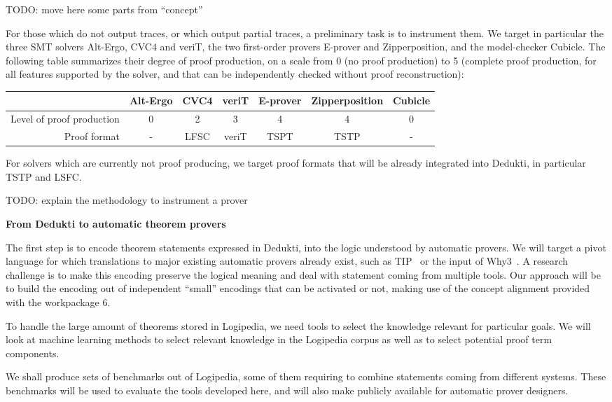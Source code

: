 TODO: move here some parts from ``concept''

For those which do not output traces, or which output partial traces, a
preliminary task is to instrument them. We target in particular the
three SMT solvers Alt-Ergo, CVC4 and veriT, the two first-order provers
E-prover and Zipperposition, and the model-checker Cubicle. The
following table summarizes their degree of proof production, on a scale
from 0 (no proof production) to 5 (complete proof production, for all
features supported by the solver, and that can be independently checked
without proof reconstruction):
%
\begin{center}
\begin{tabular}{|r|c|c|c|c|c|c|}
\hline
 & Alt-Ergo & CVC4 & veriT & E-prover & Zipperposition & Cubicle\\
\hline
Level of proof production & 0 & 2 & 3 & 4 & 4 & 0\\
\hline
Proof format & - & LFSC & veriT & TSPT & TSTP & -\\
\hline
\end{tabular}
\end{center}
%
For solvers which are currently not proof producing, we target proof
formats that will be already integrated into Dedukti, in particular TSTP
and LSFC.

TODO: explain the methodology to instrument a prover


{\bf \large From Dedukti to automatic theorem provers}

The first step is to encode theorem statements expressed in Dedukti,
into the logic understood by automatic provers. We will target a pivot
language for which translations to major existing automatic provers
already exist, such as TIP~\cite{DBLP:conf/mkm/ClaessenJRS15} or the
input of Why3~\cite{DBLP:conf/esop/FilliatreP13}. A research challenge
is to make this encoding preserve the logical meaning and deal with
statement coming from multiple tools. Our approach will be to build the
encoding out of independent ``small'' encodings that can be activated or
not, making use of the concept alignment provided with the workpackage
6.

To handle the large amount of theorems stored in Logipedia, we need
tools to select the knowledge relevant for particular goals. We will
look at machine learning methods to select relevant knowledge in the
Logipedia corpus as well as to select potential proof term components.

We shall produce sets of benchmarks out of Logipedia, some of them
requiring to combine statements coming from different systems. These
benchmarks will be used to evaluate the tools developed here, and will
also make publicly available for automatic prover designers.

